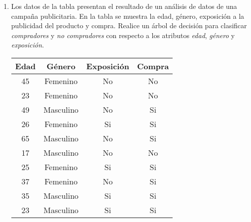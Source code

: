 \documentclass[
10pt, %
a4paper, %
]{article}
\begin{document}
\begin{enumerate}
    \item Los datos de la tabla presentan el resultado de un análisis de datos de una campaña publicitaria. En la tabla se muestra 
	la edad, género, exposición a la publicidad del producto y compra. Realice un árbol de decisión 
	para clasificar \textit{compradores} y \textit{no compradores} con respecto a los atributos \textit{edad}, \textit{género} 
	y \textit{exposición}.
        \begin{table}[H]
            \centering 
            \begin{tabular}{cccc}
                \toprule
                Edad & Género & Exposición & Compra \\ \midrule
                45 & Femenino & No & No \\
                23 & Femenino & No & No \\
                49 & Masculino & No & Si \\
                26 & Femenino & Si & Si \\
                65 & Masculino & No & Si \\
                17 & Masculino & No & No \\
                25 & Femenino & Si & Si \\
                37 & Femenino & No & Si \\
                35 & Masculino & Si & Si \\
                23 & Masculino & Si & Si \\
                \bottomrule
            \end{tabular}
        \end{table}
        

\end{enumerate}
\end{document}
